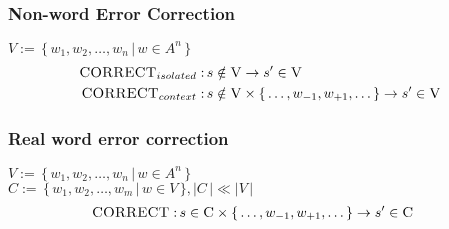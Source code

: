 \begin{frame}
\frametitle{Non-word Error Correction}
\centering
$V:= \,\{\, w_1, w_2, \ldots, w_n \,|\,w \in A^n\,\}$ \\ 
\begin{align*}
\textsc{CORRECT}_{isolated}:&\,s \notin \textsc{V} \to s^{\prime} \in \textsc{V} \\
\textsc{CORRECT}_{context}:&\,s \notin \textsc{V} \times \{\, \ldots,w_{-1},w_{+1},\ldots \,\} \to s^{\prime} \in \textsc{V}
\end{align*}
\end{frame}

\begin{frame}
\frametitle{Real word error correction}
\centering
$V := \,\{\, w_1, w_2, \ldots, w_n \,|\, w \in A^n\,\}$ \\  
$C := \,\{\, w_1, w_2, \ldots, w_m \,|\, w \in V \,\}, |C\,| \ll |V\,|$ \\
\centering
\begin{align*}
\textsc{CORRECT}:&\,s \in \textsc{C} \times \{\, \ldots,w_{-1},w_{+1},\ldots \,\} \to s^{\prime} \in \textsc{C}
\end{align*}
\end{frame}

\begin{frame}
\begin{figure}
\centering
{}
\end{figure}
\end{frame}

